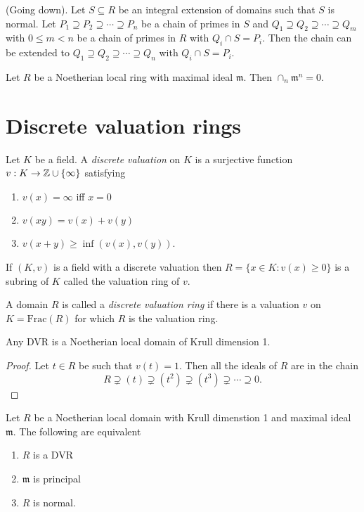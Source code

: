 \documentclass{memoir}
\begin{document}
\begin{thm}
    \label{thm:going_down}
    (Going down).
    Let $S\subseteq R$ be an integral extension of domains such that $S$ is normal.
    Let $P_1\supseteq P_2\supseteq \cdots \supseteq P_n$ be a chain of primes in $S$ and $Q_1\supseteq Q_2\supseteq \cdots \supseteq Q_m$ with $0\le m < n$ be a chain of primes in $R$ with $Q_i\cap S = P_i$.
    Then the chain can be extended to $Q_1\supseteq Q_2\supseteq \cdots \supseteq Q_n$ with $Q_i\cap S = P_i$.
\end{thm}
\begin{thm}
    \label{thm:noeth_loc_ring}
    Let $R$ be a Noetherian local ring with maximal ideal $\mathfrak m$.
    Then $\cap_n\mathfrak m^n = 0$.
\end{thm}
\section{Discrete valuation rings}
\begin{definition}
    Let $K$ be a field.
    A \textit{discrete valuation} on $K$ is a surjective function $v:K\to \mathbb{Z}\cup\{\infty\}$ satisfying
    \begin{enumerate}
        \item $v(x) = \infty$ iff $x=0$
        \item $v(xy) = v(x) + v(y)$ 
        \item $v(x+y) \ge \inf(v(x),v(y))$.
    \end{enumerate}
    If $(K,v)$ is a field with a discrete valuation then $R = \{x\in K: v(x) \ge 0\}$ is a subring of $K$ called the valuation ring of $v$.
\end{definition}
\begin{definition}
    A domain $R$ is called a \textit{discrete valuation ring} if there is a valuation $v$ on $K=\text{Frac}(R)$ for which $R$ is the valuation ring.
\end{definition}
\begin{lemma}
    Any DVR is a Noetherian local domain of Krull dimension 1.
\end{lemma}
\begin{proof}
    Let $t\in R$ be such that $v(t) = 1$.
    Then all the ideals of $R$ are in the chain 
    \begin{equation}
        R \supsetneq (t) \supsetneq (t^2) \supsetneq (t^3) \supsetneq \cdots \supseteq 0.
    \end{equation}
\end{proof}
\begin{thm}
    Let $R$ be a Noetherian local domain with Krull dimenstion 1 and maximal ideal $\mathfrak m$.
    The following are equivalent
    \begin{enumerate}
        \item $R$ is a DVR
        \item $\mathfrak m$ is principal
        \item $R$ is normal.
    \end{enumerate}
\end{thm}
\end{document}
